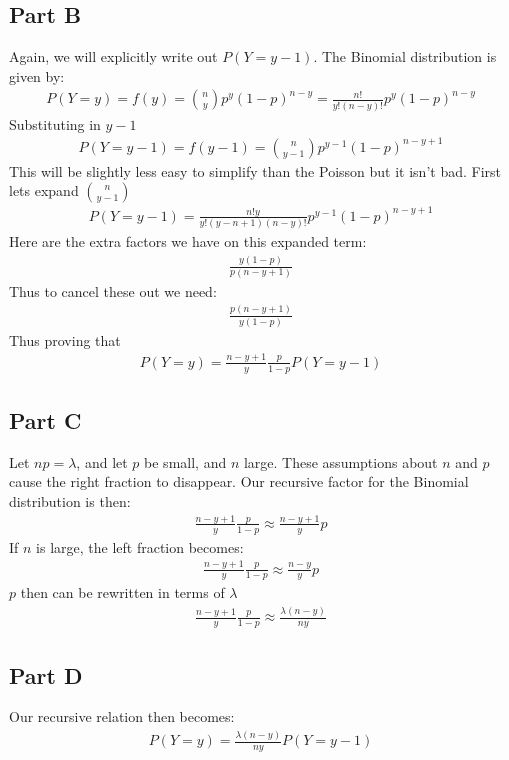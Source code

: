 \documentclass{article}
\begin{document}
\subsection*{Part B}
Again, we will explicitly write out $P(Y=y-1)$. The Binomial distribution is given by:
\begin{align*}
P(Y=y) = f(y) = \binom{n}{y} p^y (1-p)^{n-y} = \frac{n!}{y! (n-y)!} p^y (1-p)^{n-y}
\end{align*}
Substituting in $y-1$
\begin{align*}
P(Y=y-1) = f(y-1) = \binom{n}{y-1} p^{y-1} (1-p)^{n-y+1}
\end{align*}
This will be slightly less easy to simplify than the Poisson but it isn't bad. First lets expand $\binom{n}{y-1}$
\begin{align*}
P(Y=y-1) = \frac{n! y}{y!(y-n+1)(n-y)!} p^{y-1} (1-p)^{n-y+1}
\end{align*}
Here are the extra factors we have on this expanded term:
\begin{align*}
\frac{y (1-p)}{p (n-y+1)} 
\end{align*}
Thus to cancel these out we need:
\begin{align*}
\frac{p (n-y+1)}{y (1-p)} 
\end{align*}
Thus proving that 
\begin{align*}
P(Y=y) = \frac{n-y+1}{y} \frac{p}{1-p} P(Y=y-1)
\end{align*}
\subsection*{Part C}
Let $np = \lambda$, and let $p$ be small, and $n$ large. These assumptions about $n$ and $p$ cause the right fraction to disappear. Our recursive factor for the Binomial distribution is then:
\begin{align*}
\frac{n-y+1}{y} \frac{p}{1-p} \approx \frac{n-y+1}{y} p
\end{align*}
If $n$ is large, the left fraction becomes:
\begin{align*}
\frac{n-y+1}{y} \frac{p}{1-p} \approx \frac{n-y}{y} p
\end{align*}
$p$ then can be rewritten in terms of $\lambda$
\begin{align*}
\frac{n-y+1}{y} \frac{p}{1-p} \approx \frac{\lambda (n-y)}{n y}
\end{align*}
\subsection*{Part D}
Our recursive relation then becomes:
\begin{align*}
P(Y=y) = \frac{\lambda (n-y)}{n y} P(Y=y-1)
\end{align*}
\end{document}
